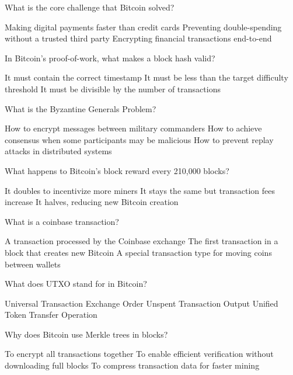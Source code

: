 \documentclass[10pt,a4paper,american]{exam}
\begin{document}
\begin{questions}
	\question What is the core challenge that Bitcoin solved?
	\begin{randomizechoices}
		\choice Making digital payments faster than credit cards
		\CorrectChoice Preventing double-spending without a trusted third party
		\choice Encrypting financial transactions end-to-end
	\end{randomizechoices}

	\question In Bitcoin's proof-of-work, what makes a block hash valid?
	\begin{randomizechoices}
		\choice It must contain the correct timestamp
		\CorrectChoice It must be less than the target difficulty threshold
		\choice It must be divisible by the number of transactions
	\end{randomizechoices}

	\question What is the Byzantine Generals Problem?
	\begin{randomizechoices}
		\choice How to encrypt messages between military commanders
		\CorrectChoice How to achieve consensus when some participants may be malicious
		\choice How to prevent replay attacks in distributed systems
	\end{randomizechoices}

	\question What happens to Bitcoin's block reward every 210,000 blocks?
	\begin{randomizechoices}
		\choice It doubles to incentivize more miners
		\choice It stays the same but transaction fees increase
		\CorrectChoice It halves, reducing new Bitcoin creation
	\end{randomizechoices}

	\question What is a coinbase transaction?
	\begin{randomizechoices}
		\choice A transaction processed by the Coinbase exchange
		\CorrectChoice The first transaction in a block that creates new Bitcoin
		\choice A special transaction type for moving coins between wallets
	\end{randomizechoices}

	\question What does UTXO stand for in Bitcoin?
	\begin{randomizechoices}
		\choice Universal Transaction Exchange Order
		\CorrectChoice Unspent Transaction Output
		\choice Unified Token Transfer Operation
	\end{randomizechoices}

	\question Why does Bitcoin use Merkle trees in blocks?
	\begin{randomizechoices}
		\choice To encrypt all transactions together
		\CorrectChoice To enable efficient verification without downloading full blocks
		\choice To compress transaction data for faster mining
	\end{randomizechoices}


\end{questions}
\end{document}
